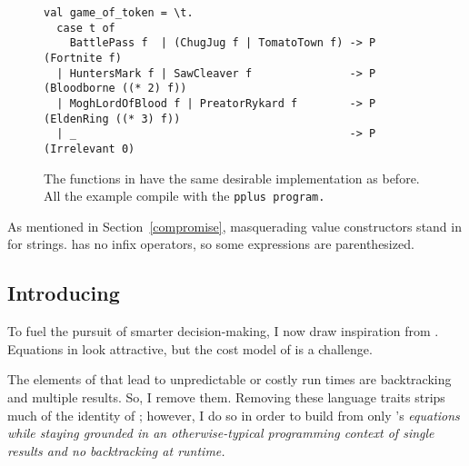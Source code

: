 \documentclass[manuscript,screen,review, 12pt, nonacm]{acmart}
\begin{document}
\begin{figure}[ht]
\begin{minipage}[h]{0.5\linewidth}
\begin{lstlisting}[numbers=none, basicstyle=\tiny, xleftmargin=2em,
                      frame=single]
   \end{lstlisting}
            \label{fig:pptriplelookup} 
        \vspace{4ex}
      \end{minipage} 
      \begin{minipage}[h]{\linewidth}
        \pplst 
        \begin{lstlisting}[numbers=none, basicstyle=\tiny, xleftmargin=9em,
          showstringspaces=false,
          frame=single]
val game_of_token = \t. 
  case t of  
    BattlePass f  | (ChugJug f | TomatoTown f) -> P (Fortnite f)
  | HuntersMark f | SawCleaver f               -> P (Bloodborne ((* 2) f))
  | MoghLordOfBlood f | PreatorRykard f        -> P (EldenRing ((* 3) f))
  | _                                          -> P (Irrelevant 0)
\end{lstlisting}
          \label{fig:ppgot}
      \vspace{4ex}
      \end{minipage}%
      \caption{The functions in \PPlus have the same desirable implementation as
      before. All the example compile with the \tt{pplus} program.}
  \label{fig:ppfuncs}
    \end{figure}        
    
    As mentioned in Section~\ref{compromise}, masquerading value constructors
    stand in for strings. \PPlus has no infix operators, so some expressions are
    parenthesized. 


\subsection{Introducing \VMinus }
\label{vminus}

        To fuel the pursuit of smarter decision-making, I now draw inspiration
        from \VC. Equations in \VC look attractive, but the cost model of \VC is
        a challenge. 
        
        The elements of \VC that lead to unpredictable or costly run times are
        backtracking and multiple results. So, I remove them. Removing these
        language traits strips much of the identity of \VC; however, I do so in
        order to build from only \VC's \it{equations} while staying grounded in
        an otherwise-typical programming context of single results and no
        backtracking at runtime. 
\end{document}
